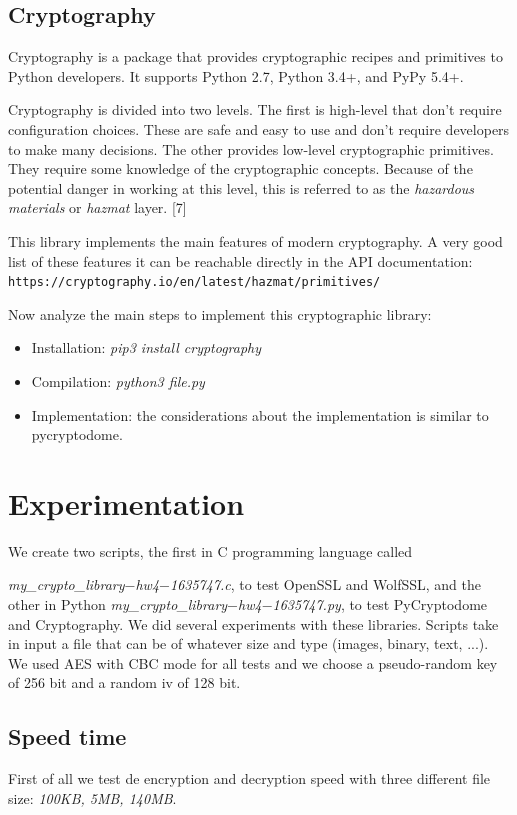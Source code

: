 \documentclass[11pt]{article}
\begin{document}
\subsection{Cryptography}
Cryptography is a package that provides cryptographic recipes and primitives to Python developers. It supports Python 2.7, Python 3.4+, and PyPy 5.4+.

Cryptography is divided into two levels. The first is high-level that don't require configuration choices. These are safe and easy to use and don’t require developers to make many decisions. The other provides low-level cryptographic primitives. They require some knowledge of the cryptographic concepts. Because of the potential danger in working at this level, this is referred to as the {\em hazardous materials} or {\em hazmat} layer. [7]

This library implements the main features of modern cryptography. A very good list of these features it can be reachable directly in the API documentation:\newline
\verb|https://cryptography.io/en/latest/hazmat/primitives/|

Now analyze the main steps to implement this cryptographic library:
\begin{itemize}
\item Installation: {\em pip3 install cryptography}
\item Compilation: {\em python3 file.py}
\item Implementation: the considerations about the implementation is similar to pycryptodome.
\end{itemize}

\section{Experimentation}
We create two scripts, the first in C programming language called

{\em my\_crypto\_library$-$hw4$-$1635747.c}, to test OpenSSL and WolfSSL, and the other in Python {\em my\_crypto\_library$-$hw4$-$1635747.py}, to test PyCryptodome and Cryptography. We did several experiments with these libraries. Scripts take in input a file that can be of whatever size and type (images, binary, text, ...). We used AES with CBC mode for all tests and we choose a pseudo-random key of 256 bit and a random iv of 128 bit.

\subsection{Speed time}
First of all we test de encryption and decryption speed with three different file size: {\em 100KB, 5MB, 140MB}.
\end{document}
